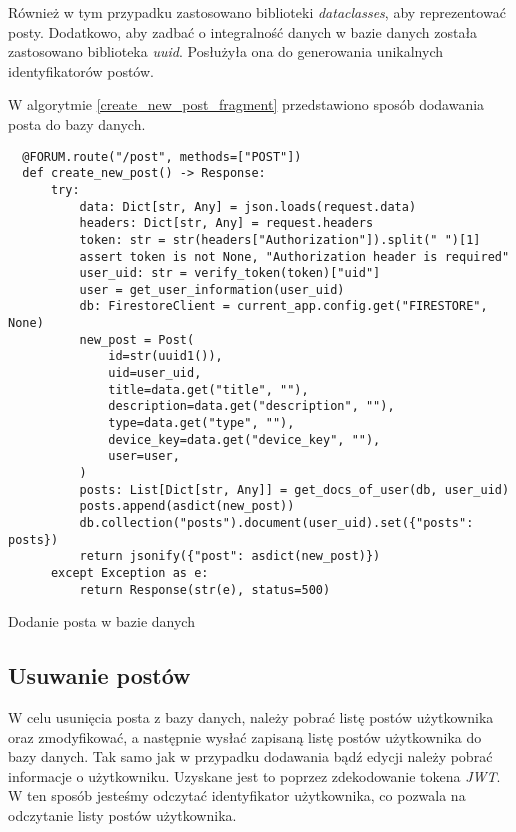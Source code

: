 Również w tym przypadku zastosowano biblioteki \textit{dataclasses}, aby reprezentować posty. Dodatkowo, aby zadbać o integralność danych w bazie danych została zastosowano biblioteka \textit{uuid}. Posłużyła ona do generowania unikalnych identyfikatorów postów.

W algorytmie \ref{create_new_post_fragment} przedstawiono sposób dodawania posta do bazy danych.

\begin{code}[H]
  \begin{verbatim}
  @FORUM.route("/post", methods=["POST"])
  def create_new_post() -> Response:
      try:
          data: Dict[str, Any] = json.loads(request.data)
          headers: Dict[str, Any] = request.headers
          token: str = str(headers["Authorization"]).split(" ")[1]
          assert token is not None, "Authorization header is required"
          user_uid: str = verify_token(token)["uid"]
          user = get_user_information(user_uid)
          db: FirestoreClient = current_app.config.get("FIRESTORE", None)
          new_post = Post(
              id=str(uuid1()),
              uid=user_uid,
              title=data.get("title", ""),
              description=data.get("description", ""),
              type=data.get("type", ""),
              device_key=data.get("device_key", ""),
              user=user,
          )
          posts: List[Dict[str, Any]] = get_docs_of_user(db, user_uid)
          posts.append(asdict(new_post))
          db.collection("posts").document(user_uid).set({"posts": posts})
          return jsonify({"post": asdict(new_post)})
      except Exception as e:
          return Response(str(e), status=500)
  \end{verbatim}
  \caption{Dodanie posta w bazie danych}
  \label{create_new_post_fragment}
\end{code}

\subsection{Usuwanie postów}
W celu usunięcia posta z bazy danych, należy pobrać listę postów użytkownika oraz zmodyfikować, a następnie wysłać zapisaną listę postów użytkownika do bazy danych. Tak samo jak w przypadku dodawania bądź edycji należy pobrać informacje o użytkowniku. Uzyskane jest to poprzez zdekodowanie tokena \textit{JWT}. W ten sposób jesteśmy odczytać identyfikator użytkownika, co pozwala na odczytanie listy postów użytkownika.

